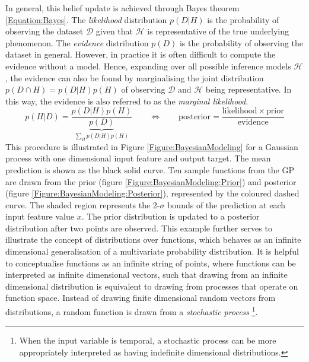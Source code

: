 			In general, this belief update is achieved through Bayes theorem \eqref{Equation:Bayes}. The \textit{likelihood} distribution $p(D | H)$ is the probability of observing the dataset $\mathcal{D}$ given that $\mathcal{H}$ is representative of the true underlying phenomenon. The \textit{evidence} distribution $p(D)$ is the probability of observing the dataset in general. However, in practice it is often difficult to compute the evidence without a model. Hence, expanding over all possible inference models $\mathcal{H}$, the evidence can also be found by marginalising the joint distribution $p(D \cap H) = p(D | H) p(H)$ of observing $\mathcal{D}$ and $\mathcal{H}$ being representative. In this way, the evidence is also referred to as the \textit{marginal likelihood}. \begin{equation}
				p(H | D) = \frac{p(D | H) p(H)}{\underbrace{p(D)}_{\sum_{H} p(D | H) p(H)}} \qquad \Longleftrightarrow \qquad \mathrm{posterior} = \frac{\mathrm{likelihood} \times \mathrm{prior}}{\mathrm{evidence}}
			\label{Equation:Bayes}
			\end{equation} This procedure is illustrated in Figure \ref{Figure:BayesianModeling} for a Gaussian process with one dimensional input feature and output target. The mean prediction is shown as the black solid curve. Ten sample functions from the GP are drawn from the prior (figure \ref{Figure:BayesianModeling:Prior}) and posterior (figure \ref{Figure:BayesianModeling:Posterior}), represented by the coloured dashed curve. The shaded region represents the 2-$\sigma$ bounds of the prediction at each input feature value $x$. The prior distribution is updated to a posterior distribution after two points are observed. This example further serves to illustrate the concept of distributions over functions, which behaves as an infinite dimensional generalisation of a multivariate probability distribution. It is helpful to conceptualise functions as an infinite string of points, where functions can be interpreted as infinite dimensional vectors, such that drawing from an infinite dimensional distribution is equivalent to drawing from processes that operate on function space. Instead of drawing finite dimensional random vectors from distributions, a random function is drawn from a \textit{stochastic process} \footnote{When the input variable is temporal, a stochastic process can be more appropriately interpreted as having indefinite dimensional distributions.}.
			

